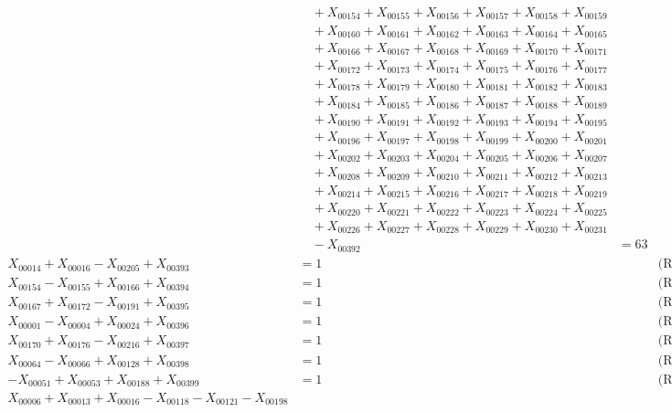 \documentclass[a4paper,10pt]{article}
\begin{document}
{\begin{align}
&\quad  + X_{00154} + X_{00155} + X_{00156} + X_{00157} + X_{00158} + X_{00159} \\[0.5ex]
&\quad  + X_{00160} + X_{00161} + X_{00162} + X_{00163} + X_{00164} + X_{00165} \\[0.5ex]
&\quad  + X_{00166} + X_{00167} + X_{00168} + X_{00169} + X_{00170} + X_{00171} \\[0.5ex]
&\quad  + X_{00172} + X_{00173} + X_{00174} + X_{00175} + X_{00176} + X_{00177} \\[0.5ex]
&\quad  + X_{00178} + X_{00179} + X_{00180} + X_{00181} + X_{00182} + X_{00183} \\[0.5ex]
&\quad  + X_{00184} + X_{00185} + X_{00186} + X_{00187} + X_{00188} + X_{00189} \\[0.5ex]
&\quad  + X_{00190} + X_{00191} + X_{00192} + X_{00193} + X_{00194} + X_{00195} \\[0.5ex]
&\quad  + X_{00196} + X_{00197} + X_{00198} + X_{00199} + X_{00200} + X_{00201} \\[0.5ex]
&\quad  + X_{00202} + X_{00203} + X_{00204} + X_{00205} + X_{00206} + X_{00207} \\[0.5ex]
&\quad  + X_{00208} + X_{00209} + X_{00210} + X_{00211} + X_{00212} + X_{00213} \\[0.5ex]
&\quad  + X_{00214} + X_{00215} + X_{00216} + X_{00217} + X_{00218} + X_{00219} \\[0.5ex]
&\quad  + X_{00220} + X_{00221} + X_{00222} + X_{00223} + X_{00224} + X_{00225} \\[0.5ex]
&\quad  + X_{00226} + X_{00227} + X_{00228} + X_{00229} + X_{00230} + X_{00231} \\[0.5ex]
&\quad  - X_{00392} &= 63 && \text{(R00161)} \\
X_{00014} + X_{00016} - X_{00205} + X_{00393} &= 1 && \text{(R00162)} \\
X_{00154} - X_{00155} + X_{00166} + X_{00394} &= 1 && \text{(R00163)} \\
X_{00167} + X_{00172} - X_{00191} + X_{00395} &= 1 && \text{(R00164)} \\
X_{00001} - X_{00004} + X_{00024} + X_{00396} &= 1 && \text{(R00165)} \\
X_{00170} + X_{00176} - X_{00216} + X_{00397} &= 1 && \text{(R00166)} \\
X_{00064} - X_{00066} + X_{00128} + X_{00398} &= 1 && \text{(R00167)} \\
-X_{00051} + X_{00053} + X_{00188} + X_{00399} &= 1 && \text{(R00168)} \\
X_{00006} + X_{00013} + X_{00016} - X_{00118} - X_{00121} - X_{00198} \\[0.5ex]

\end{align}}
\end{document}
